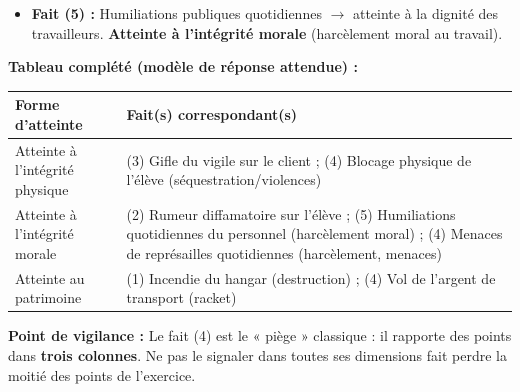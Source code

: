 \documentclass[11pt]{article}
\newcommand{\cle}[1]{{\popxbold\color{popdark}#1}}
\begin{document}
\begin{exoresolu}
\begin{itemize}
\item \textbf{Fait (5) :} Humiliations publiques quotidiennes $\rightarrow$ atteinte à la dignité des travailleurs. \textbf{Atteinte à l'intégrité morale} (\cle{harcèlement moral} au travail).
\end{itemize}
\textbf{Tableau complété (modèle de réponse attendue) :}
\begin{center}
\begin{tabularx}{\linewidth}{|l|X|}\hline
\rowcolor{popblueL} \textbf{Forme d'atteinte} & \textbf{Fait(s) correspondant(s)} \\ \hline
Atteinte à l'intégrité physique & (3) Gifle du vigile sur le client ; (4) Blocage physique de l'élève (séquestration/violences) \\ \hline
Atteinte à l'intégrité morale & (2) Rumeur diffamatoire sur l'élève ; (5) Humiliations quotidiennes du personnel (harcèlement moral) ; (4) Menaces de représailles quotidiennes (harcèlement, menaces) \\ \hline
Atteinte au patrimoine & (1) Incendie du hangar (destruction) ; (4) Vol de l'argent de transport (racket) \\ \hline
\end{tabularx}
\end{center}
\textbf{Point de vigilance :} Le fait (4) est le « piège » classique : il rapporte des points dans \textbf{trois colonnes}. Ne pas le signaler dans toutes ses dimensions fait perdre la moitié des points de l'exercice.
\end{exoresolu}
\end{document}
